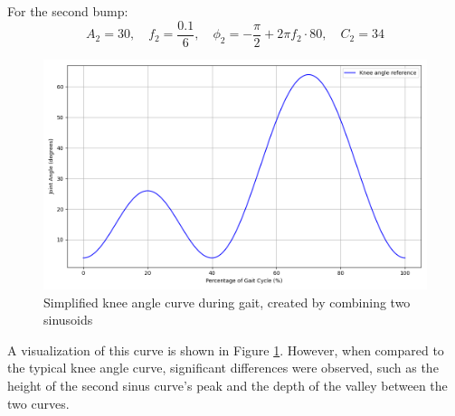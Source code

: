 For the second bump:
\[
A_2 = 30, \quad f_2 = \frac{0.1}{6}, \quad \phi_2 = -\frac{\pi}{2} + 2\pi f_2 \cdot 80, \quad C_2 = 34
\]
\begin{figure} [H]
    \centering
    \includegraphics[width=0.8\linewidth]{images/simpleKneeAngle.png}
    \caption{Simplified knee angle curve during gait, created by combining two sinusoids}
    \label{fig:simplecurve}
\end{figure}

A visualization of this curve is shown in Figure \ref{fig:simplecurve}. However, when compared to the typical knee angle curve, significant differences were observed, such as the height of the second sinus curve's peak and the depth of the valley between the two curves.



